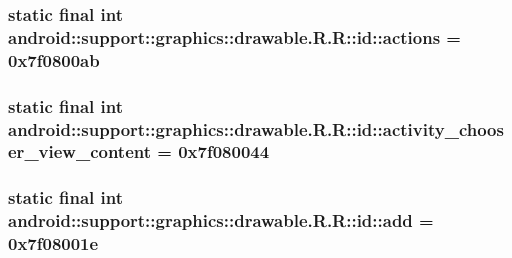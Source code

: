 \hypertarget{classandroid_1_1support_1_1graphics_1_1drawable_1_1_r_1_1id_7668bd5ec70bc6aee41c9b1b22356d9c}{
\subsubsection[{actions}]{\setlength{\rightskip}{0pt plus 5cm}static final int android::support::graphics::drawable.R.R::id::actions = 0x7f0800ab}}
\label{classandroid_1_1support_1_1graphics_1_1drawable_1_1_r_1_1id_7668bd5ec70bc6aee41c9b1b22356d9c}


\hypertarget{classandroid_1_1support_1_1graphics_1_1drawable_1_1_r_1_1id_7edfe3ff129b72d3191c5ef8a74d8255}{
\subsubsection[{activity\_\-chooser\_\-view\_\-content}]{\setlength{\rightskip}{0pt plus 5cm}static final int android::support::graphics::drawable.R.R::id::activity\_\-chooser\_\-view\_\-content = 0x7f080044}}
\label{classandroid_1_1support_1_1graphics_1_1drawable_1_1_r_1_1id_7edfe3ff129b72d3191c5ef8a74d8255}


\hypertarget{classandroid_1_1support_1_1graphics_1_1drawable_1_1_r_1_1id_8124590fd5a4335f7c1e8c2f92954e43}{
\subsubsection[{add}]{\setlength{\rightskip}{0pt plus 5cm}static final int android::support::graphics::drawable.R.R::id::add = 0x7f08001e}}
\label{classandroid_1_1support_1_1graphics_1_1drawable_1_1_r_1_1id_8124590fd5a4335f7c1e8c2f92954e43}


